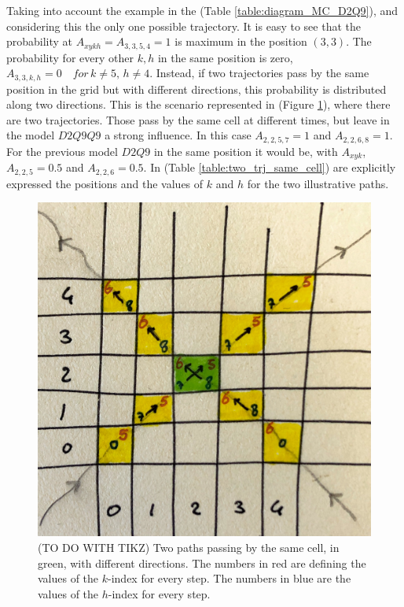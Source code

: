 \documentclass[class=article, crop=false]{standalone}
\begin{document}
Taking into account the example in the (Table \ref{table:diagram_MC_D2Q9}), and considering this the only one possible trajectory.
It is easy to see that the probability at $A_{x y k h} = A_{3, 3, 5, 4} = 1$ is maximum in the position $(3, 3)$.
The probability for every other $k, h$ in the same position is zero, $A_{3, 3, k, h} = 0 \quad for \, k \neq 5, \, h \neq 4$.
Instead, if two trajectories pass by the same position in the grid but with different directions, this probability is distributed along two directions.
This is the scenario represented in (Figure \ref{fig:two_trj_same_cell}), where there are two trajectories.
Those pass by the same cell at different times, but leave in the model $D2Q9Q9$ a strong influence.
In this case $A_{2, 2, 5, 7} = 1$ and $A_{2, 2, 6, 8} = 1$.
For the previous model $D2Q9$ in the same position it would be, with $A_{x y k}$, $A_{2, 2, 5} = 0.5$ and $A_{2, 2, 6} = 0.5$.
In (Table \ref{table:two_trj_same_cell}) are explicitly expressed the positions and the values of $k$ and $h$ for the two illustrative paths.
\begin{figure}[h]
\centering
\includegraphics[scale=0.1]{draw/eg_distribution_two_trajectories_1}
\captionsetup{width=.7\linewidth}
\caption{(TO DO WITH TIKZ) Two paths passing by the same cell, in green, with different directions.
The numbers in red are defining the values of the $k$-index for every step.
The numbers in blue are the values of the $h$-index for every step.}
\label{fig:two_trj_same_cell}
\end{figure}
\end{document}
